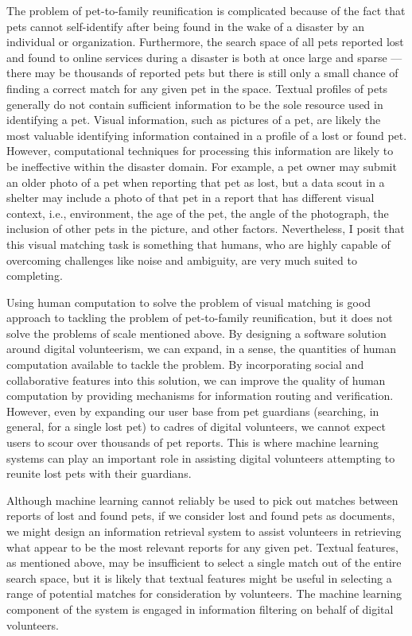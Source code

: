 The problem of pet-to-family reunification is complicated because of the fact that pets cannot self-identify after being found in the wake of a disaster by an individual or organization.  Furthermore, the search space of all pets reported lost and found to online services during a disaster is both at once large and sparse --- there may be thousands of reported pets but there is still only a small chance of finding a correct match for any given pet in the space.  Textual profiles of pets generally do not contain sufficient information to be the sole resource used in identifying a pet.  Visual information, such as pictures of a pet, are likely the most valuable identifying information contained in a profile of a lost or found pet.  However, computational techniques for processing this information are likely to be ineffective within the disaster domain.  For example, a pet owner may submit an older photo of a pet when reporting that pet as lost, but a data scout in a shelter may include a photo of that pet in a report that has different visual context, i.e., environment, the age of the pet, the angle of the photograph, the inclusion of other pets in the picture, and other factors.  Nevertheless, I posit that this visual matching task is something that humans, who are highly capable of overcoming challenges like noise and ambiguity, are very much suited to completing.

Using human computation to solve the problem of visual matching is good approach to tackling the problem of pet-to-family reunification, but it does not solve the problems of scale mentioned above.  By designing a software solution around digital volunteerism, we can expand, in a sense, the quantities of human computation available to tackle the problem.  By incorporating social and collaborative features into this solution, we can improve the quality of human computation by providing mechanisms for information routing and verification.  However, even by expanding our user base from pet guardians (searching, in general, for a single lost pet) to cadres of digital volunteers, we cannot expect users to scour over thousands of pet reports.  This is where machine learning systems can play an important role in assisting digital volunteers attempting to reunite lost pets with their guardians.

Although machine learning cannot reliably be used to pick out matches between reports of lost and found pets, if we consider lost and found pets as documents, we might design an information retrieval system to assist volunteers in retrieving what appear to be the most relevant reports for any given pet.  Textual features, as mentioned above, may be insufficient to select a single match out of the entire search space, but it is likely that textual features might be useful in selecting a range of potential matches for consideration by volunteers.  The machine learning component of the system is engaged in information filtering on behalf of digital volunteers.

